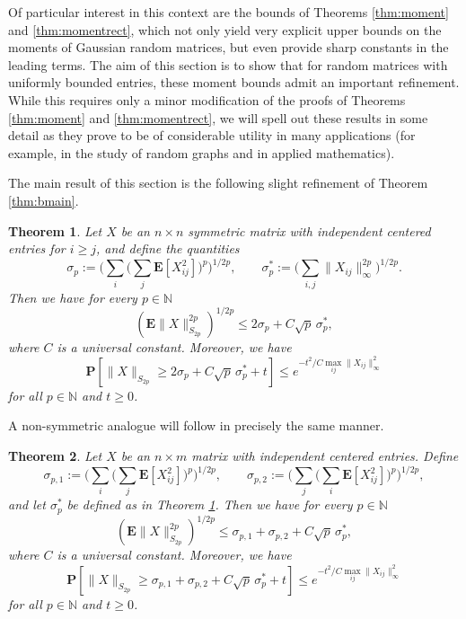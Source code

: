 \documentclass[10pt,reqno]{amsart}
\newtheorem{thm}{Theorem}[section]
\theoremstyle{definition}
\numberwithin{equation}{section}
\numberwithin{figure}{section}
\numberwithin{table}{section}
\begin{document}
Of particular interest in this context are the bounds of Theorems 
\ref{thm:moment} and \ref{thm:momentrect}, which not only yield very 
explicit upper bounds on the moments of Gaussian random matrices, but even 
provide sharp constants in the leading terms. The aim of this section is 
to show that for random matrices with uniformly bounded entries, these 
moment bounds admit an important refinement. While this requires only a 
minor modification of the proofs of Theorems \ref{thm:moment} and 
\ref{thm:momentrect}, we will spell out these results in some detail as 
they prove to be of considerable utility in many applications (for 
example, in the study of random graphs and in applied mathematics).

The main result of this section is the following slight refinement of
Theorem \ref{thm:bmain}.

\begin{thm}
\label{thm:bmoment}
Let $X$ be an $n\times n$ symmetric matrix with independent 
centered entries for $i\ge j$, and define the quantities
$$
	\sigma_p :=
	\Bigg(\sum_i\Bigg(\sum_j 
	\mathbf{E}[X_{ij}^2]\Bigg)^p\Bigg)^{1/2p},
	\qquad
	\sigma_p^* :=
	\Bigg(\sum_{i,j}
	\|X_{ij}\|_\infty^{2p}\Bigg)^{1/2p}.
$$
Then we have for every $p\in\mathbb{N}$
$$
	(\mathbf{E}\|X\|_{S_{2p}}^{2p})^{1/2p} \le
	2\sigma_p + C\sqrt{p}\,\sigma_p^*,
$$
where $C$ is a universal constant. Moreover, we have
$$
	\mathbf{P}[\|X\|_{S_{2p}}\ge 2\sigma_p+C\sqrt{p}\,\sigma_p^*+t] \le
	e^{-t^2/C\max_{ij}\|X_{ij}\|_\infty^2}
$$
for all $p\in\mathbb{N}$ and $t\ge 0$.
\end{thm}

A non-symmetric analogue will follow in precisely the same manner.

\begin{thm}
\label{thm:bmomentrect}
Let $X$ be an $n\times m$ matrix with independent 
centered entries. Define
$$
	\sigma_{p,1} :=
	\Bigg(\sum_i\Bigg(\sum_j 
	\mathbf{E}[X_{ij}^2]\Bigg)^p\Bigg)^{1/2p},
	\qquad
	\sigma_{p,2} :=
	\Bigg(\sum_j\Bigg(\sum_i 
	\mathbf{E}[X_{ij}^2]\Bigg)^p\Bigg)^{1/2p},
$$
and let $\sigma_p^*$ be defined as in Theorem \ref{thm:bmoment}.
Then we have for every $p\in\mathbb{N}$
$$
	(\mathbf{E}\|X\|_{S_{2p}}^{2p})^{1/2p} \le
	\sigma_{p,1} + \sigma_{p,2} + 
	C\sqrt{p}\,\sigma_p^*,
$$
where $C$ is a universal constant. Moreover, we have
$$
	\mathbf{P}[\|X\|_{S_{2p}}\ge 
	\sigma_{p,1} + \sigma_{p,2} +
        C\sqrt{p}\,\sigma_p^*+t]
	\le
	e^{-t^2/C\max_{ij}\|X_{ij}\|_\infty^2}
$$
for all $p\in\mathbb{N}$ and $t\ge 0$.
\end{thm}
\end{document}
